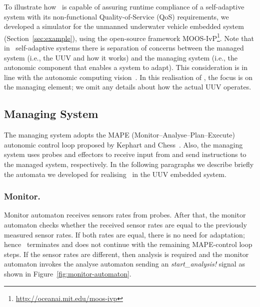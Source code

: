 To illustrate how \approach\ is capable of assuring runtime compliance of a self-adaptive system with its non-functional Quality-of-Service (QoS) requirements,  we developed a simulator for the  unmanned underwater vehicle embedded system (Section~\ref{sec:example}), using the open-source framework MOOS-IvP\footnote{\url{http://oceanai.mit.edu/moos-ivp}}. Note that  in \approach\ self-adaptive systems there is separation of concerns between the managed system (i.e., the UUV and how it works) and the managing system (i.e., the autonomic component that enables a system to adapt). This consideration is in line with the autonomic computing vision~\cite{Kephart2003:Comp}. In this realisation of \approach, the focus is on the managing element; we omit any details about how the actual  UUV operates.

\subsection{Managing System}
The managing system adopts the MAPE (Monitor--Analyse--Plan--Execute) autonomic control loop proposed by Kephart and Chess~\cite{Kephart2003:Comp}. Also, the managing system uses probes and effectors to receive input from and send instructions to the managed system, respectively. In the following paragraphs we describe briefly the automata we developed for realising \approach\ in the UUV embedded system.

\subsubsection{Monitor.}
Monitor automaton receives sensors rates from probes. After that, the monitor automaton checks whether the received sensor rates are equal to the previously measured sensor rates. If both rates are equal, there is no need for adaptation; hence \approach\ terminates and does not continue with the remaining MAPE-control loop steps. If the sensor rates are different, then analysis is required and the monitor automaton invokes the analyse automaton sending an \textit{start\_analysis!} signal as shown in Figure~\ref{fig:monitor-automaton}. 

